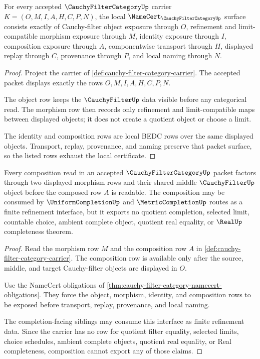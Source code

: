 \begin{theorem}
\label{thm:cauchy-filter-category-namecert-obligations}
For every accepted $\CauchyFilterCategoryUp$ carrier $K=(O,M,I,A,H,C,P,N)$, the local $\NameCert_{\CauchyFilterCategoryUp}$ surface consists exactly of Cauchy-filter object exposure through $O$, refinement and limit-compatible morphism exposure through $M$, identity exposure through $I$, composition exposure through $A$, componentwise transport through $H$, displayed replay through $C$, provenance through $P$, and local naming through $N$.
\end{theorem}
\begin{proof}
Project the carrier of \autoref{def:cauchy-filter-category-carrier}. The accepted packet displays exactly the rows $O,M,I,A,H,C,P,N$.

The object row keeps the $\CauchyFilterUp$ data visible before any categorical read. The morphism row then records only refinement and limit-compatible maps between displayed objects; it does not create a quotient object or choose a limit.

The identity and composition rows are local BEDC rows over the same displayed objects. Transport, replay, provenance, and naming preserve that packet surface, so the listed rows exhaust the local certificate.
\end{proof}

\begin{theorem}
\label{thm:cauchy-filter-category-composition-nonescape}
Every composition read in an accepted $\CauchyFilterCategoryUp$ packet factors through two displayed morphism rows and their shared middle $\CauchyFilterUp$ object before the composed row $A$ is readable. The composition may be consumed by $\UniformCompletionUp$ and $\MetricCompletionUp$ routes as a finite refinement interface, but it exports no quotient completion, selected limit, countable choice, ambient complete object, quotient real equality, or $\RealUp$ completeness theorem.
\end{theorem}
\begin{proof}
Read the morphism row $M$ and the composition row $A$ in \autoref{def:cauchy-filter-category-carrier}. The composition row is available only after the source, middle, and target Cauchy-filter objects are displayed in $O$.

Use the NameCert obligations of \autoref{thm:cauchy-filter-category-namecert-obligations}. They force the object, morphism, identity, and composition rows to be exposed before transport, replay, provenance, and local naming.

The completion-facing siblings may consume this interface as finite refinement data. Since the carrier has no row for quotient filter equality, selected limits, choice schedules, ambient complete objects, quotient real equality, or Real completeness, composition cannot export any of those claims.
\end{proof}

